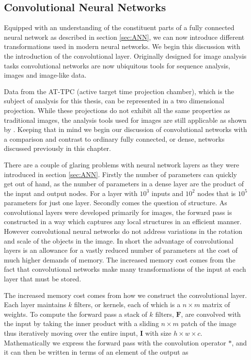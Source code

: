 \subsection{Convolutional Neural Networks}\label{sec:cnn}

Equipped with an understanding of the constituent parts of a fully connected neural network as described in section \ref{sec:ANN}, we can now introduce different transformations used in modern neural networks. We begin this discussion with the introduction of the convolutional layer. Originally designed for image analysis tasks convolutional networks are now ubiquitous tools for sequence analysis, images and image-like data. 

Data from the AT-TPC (active target time projection chamber), which is the subject of analysis for this thesis, can be represented in a two dimensional projection. While these projections do not exhibit all the same properties as traditional images, the analysis tools used for images are still applicable as shown by \citet{Kuchera2019}. Keeping that in mind we begin our discussion of convolutional networks with a comparison and contrast to ordinary fully connected, or dense, networks discussed previously in this chapter.

There are a couple of glaring problems with neural network layers as they were introduced in section \ref{sec:ANN}. Firstly the number of parameters can quickly get out of hand, as the number of parameters in a dense layer are the product of the input and output nodes. For a layer with $10^3$ inputs and $10^2$ nodes that is $10^5$ parameters for just one layer. Secondly comes the question of structure. As convolutional layers were developed primarily for images, the forward pass is constructed in a way which captures any local structures in an efficient manner. However convolutional neural networks do not address variations in the rotation and scale of the objects in the image. In short the advantage of convolutional layers is an allowance for a vastly reduced number of parameters at the cost of much higher demands of memory. The increased memory cost comes from the fact that convolutional networks make many transformations of the input at each layer that must be stored.

The increased memory cost comes from how we construct the convolutional layer. Each layer maintains $k$ filters, or kernels, each of which is a $n\times m$ matrix of weights. To compute the forward pass a stack of $k$ filters, $\mathbf{F}$, are convolved with the input by taking the inner product with a sliding $n\times m$ patch of the image thus iteratively moving over the entire input, $\mathbf{I}$ with size $h \times w \times c$. Mathematically we express the forward pass with the convolution operator $*$, and it can then be written in terms of an element of the output as


